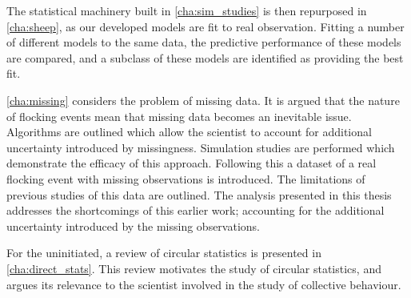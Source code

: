 The statistical machinery built in \cref{cha:sim_studies} is then repurposed in
\cref{cha:sheep}, as our developed models are fit to real observation. Fitting
a number of different models to the same data, the predictive performance of
these models are compared, and a subclass of these models are identified as
providing the best fit.

\cref{cha:missing} considers the problem of missing data. It is argued that the
nature of flocking events mean that missing data becomes an inevitable issue.
Algorithms are outlined which allow the scientist to account for additional
uncertainty introduced by missingness. Simulation studies are performed which
demonstrate the efficacy of this approach. Following this a dataset of a real
flocking event with missing observations is introduced. The limitations of
previous studies of this data are outlined. The analysis presented in this
thesis addresses the shortcomings of this earlier work; accounting for the
additional uncertainty introduced by the missing observations.

For the uninitiated, a review of circular statistics is presented in
\cref{cha:direct_stats}. This review motivates the study of circular
statistics, and argues its relevance to the scientist involved in the study of
collective behaviour.
